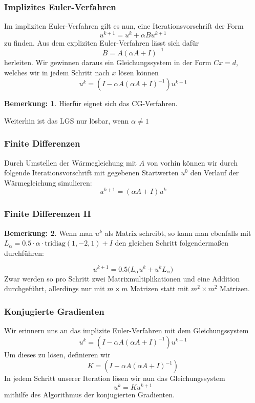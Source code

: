 \documentclass[xcolor = dvipsnames, notheorems, 10pt]{beamer}
\newcommand{\vth}{\vspace{4pt}}
\theoremstyle{definition}
\newtheorem{remark}		{Bemerkung:\vth}
\begin{document}
\begin{frame}
\frametitle{Implizites Euler-Verfahren}
	Im impliziten Euler-Verfahren gilt es nun, eine Iterationsvorschrift der Form
	$$ u^{k+1} = u^k + \alpha Bu^{k+1} $$
	zu finden.
	Aus dem expliziten Euler-Verfahren lässt sich dafür
	$$ B = A (\alpha A + I)^{-1} $$
	herleiten.
	Wir gewinnen daraus ein Gleichungssystem in der Form $Cx = d$, welches wir in jedem Schritt nach $x$ lösen können
	$$ u^k = (I - \alpha A (\alpha A + I)^{-1}) u^{k+1} $$
	\begin{remark}
		Hierfür eignet sich das CG-Verfahren.

		Weiterhin ist das LGS nur lösbar, wenn $\alpha \neq 1$
	\end{remark}

\end{frame}

\begin{frame}
\frametitle{Finite Differenzen}
	Durch Umstellen der Wärmegleichung mit $A$ von vorhin können wir durch folgende Iterationsvorschrift mit gegebenen Startwerten $u^0$ den Verlauf der Wärmegleichung simulieren:
	$$u^{k+1} = (\alpha A+I)u^k$$
\end{frame}

\begin{frame}
\frametitle{Finite Differenzen II}
	\begin{remark}
		Wenn man $u^k$ als Matrix schreibt, so kann man ebenfalls mit $L_\alpha = 0.5 \cdot \alpha \cdot \text{tridiag}(1,-2,1) + I$ den gleichen Schritt folgendermaßen durchführen:

		$$u^{k+1} = 0.5 \big( L_\alpha u^k + u^kL_\alpha \big)$$
		Zwar werden so pro Schritt zwei Matrixmultiplikationen und eine Addition durchgeführt, allerdings nur mit $m \times m$ Matrizen statt mit $m^2 \times m^2$ Matrizen.
	\end{remark}
\end{frame}


\begin{frame}
\frametitle{Konjugierte Gradienten}
	Wir erinnern uns an das implizite Euler-Verfahren mit dem Gleichungssystem 
		$$ u^k = (I - \alpha A (\alpha A + I)^{-1}) u^{k+1} $$
	Um dieses zu lösen, definieren wir 
		$$ K = (I - \alpha A (\alpha A + I)^{-1})$$
	In jedem Schritt unserer Iteration lösen wir nun das Gleichungssystem
		$$ u^k = Ku^{k+1}$$
	mithilfe des Algorithmus der konjugierten Gradienten.

\end{frame}
\end{document}
